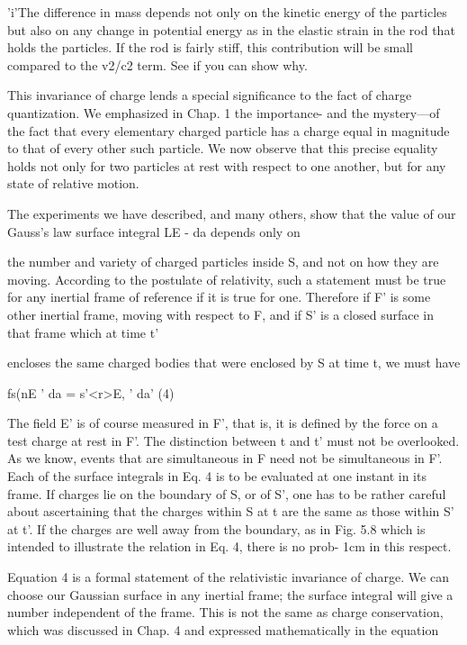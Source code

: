 'i'The difference in mass depends not only on the kinetic energy of the particles but
also on any change in potential energy as in the elastic strain in the rod that holds the
particles. If the rod is fairly stiff, this contribution will be small compared to the v2/c2
term. See if you can show why.

This invariance of charge lends a special significance to the fact of
charge quantization. We emphasized in Chap. 1 the importance-
and the mystery---of the fact that every elementary charged particle
has a charge equal in magnitude to that of every other such particle.
We now observe that this precise equality holds not only for two
particles at rest with respect to one another, but for any state of relative
motion.

The experiments we have described, and many others, show that
the value of our Gauss's law surface integral LE - da depends only on

the number and variety of charged particles inside S, and not on how
they are moving. According to the postulate of relativity, such a
statement must be true for any inertial frame of reference if it is true
for one. Therefore if F' is some other inertial frame, moving with
respect to F, and if S' is a closed surface in that frame which at time t'

encloses the same charged bodies that were enclosed by S at time t,
we must have

\begin{equation}
\end{equation}
fs(nE ' da = s'<r>E, ' da' (4)

The field E' is of course measured in F', that is, it is defined by the
force on a test charge at rest in F'. The distinction between t and t'
must not be overlooked. As we know, events that are simultaneous
in F need not be simultaneous in F'. Each of the surface integrals in
Eq. 4 is to be evaluated at one instant in its frame. If charges lie on
the boundary of S, or of S', one has to be rather careful about ascertaining
that the charges within S at t are the same as those within S'
at t'. If the charges are well away from the boundary, as in Fig. 5.8
which is intended to illustrate the relation in Eq. 4, there is no prob-
1cm in this respect.

Equation 4 is a formal statement of the relativistic invariance of
charge. We can choose our Gaussian surface in any inertial frame;
the surface integral will give a number independent of the frame.
This is not the same as charge conservation, which was discussed in
Chap. 4 and expressed mathematically in the equation

